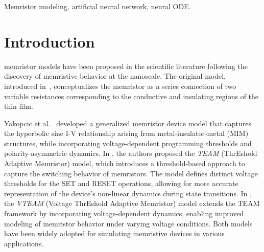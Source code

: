 \documentclass{ieeeaccess}
\begin{document}
\begin{keywords}
Memristor modeling, artificial neural network, neural ODE. 
\end{keywords}

\titlepgskip=-21pt

\maketitle

\section{Introduction}
\label{sec:introduction}
  memristor models have been proposed in the scientific literature following the discovery of memristive behavior at the nanoscale. The original model, introduced in~\cite{Strukov2008}, conceptualizes the memristor as a series connection of two variable resistances corresponding to the conductive and insulating regions of the thin film.

Yakopcic et al.~\cite{Yakopcic2011} developed a generalized memristor device model that captures the hyperbolic sine I-V relationship arising from metal-insulator-metal (MIM) structures, while incorporating voltage-dependent programming thresholds and polarity-asymmetric dynamics. In \cite{Kvatinsky2013}, the authors proposed the \textit{TEAM} (ThrEshold Adaptive Memristor) model, which introduces a threshold-based approach to capture the switching behavior of memristors. The model defines distinct voltage thresholds for the SET and RESET operations, allowing for more accurate representation of the device's non-linear dynamics during state transitions. In \cite{Kvatinsky2015}, the \textit{VTEAM} (Voltage ThrEshold Adaptive Memristor) model extends the TEAM framework by incorporating voltage-dependent dynamics, enabling improved modeling of memristor behavior under varying voltage conditions. Both models have been widely adopted for simulating memristive devices in various applications.
\end{document}
